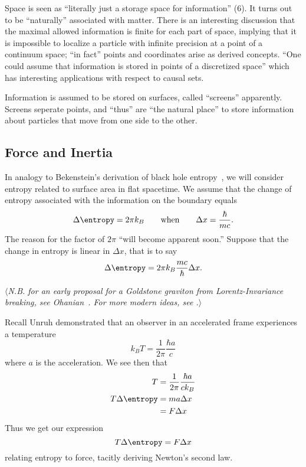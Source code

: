 Space is seen as ``literally just a storage space for
information'' (6). It turns out to be ``naturally'' associated
with matter. There is an interesting discussion that the maximal
allowed information is finite for each part of space, implying
that it is impossible to localize a particle with infinite
precision at a point of a continuum space; ``in fact'' points and
coordinates arise as derived concepts. ``One could assume that
information is stored in points of a discretized space'' which
has interesting applications with respect to causal sets.

Information is assumed to be stored on surfaces, called
``screens'' apparently. Screens seperate points, and ``thus'' are
``the natural place'' to store information about particles that
move from one side to the other.

\subsection{Force and Inertia}

In analogy to Bekenstein's derivation of black hole
entropy~\cite{Bekenstein:1973ur}, we will consider entropy
related to surface area in flat spacetime. We assume that the
change of entropy associated with the information on the boundary
equals
\begin{equation}
\Delta\entropy=2\pi k_{B}\qquad\hbox{when}\qquad\Delta x=\frac{\hbar}{mc}.
\end{equation}
The reason for the factor of $2\pi$ ``will become apparent
soon.'' Suppose that the change in entropy is linear in $\Delta
x$, that is to say
\begin{equation}
\Delta\entropy=2\pi k_{B}\frac{mc}{\hbar}\Delta x.
\end{equation}

\noindent$\langle$\emph{N.B. for an early proposal for a Goldstone graviton from
Lorentz-Invariance breaking, see
Ohanian~\cite{PhysRev.184.1305}. For more modern ideas, see \cite{Jenkins:2003hw}.}$\rangle$

Recall Unruh demonstrated that an observer in an accelerated
frame experiences a temperature
\begin{equation}
k_{B}T=\frac{1}{2\pi}\frac{\hbar a}{c}
\end{equation}
where $a$ is the acceleration. We see then that
\begin{subequations}
\begin{align}
T &= \frac{1}{2\pi}\frac{\hbar a}{ck_{B}}\\
T\Delta\entropy &= ma\Delta x\\
&=F\Delta x
\end{align}
\end{subequations}
Thus we get our expression
\begin{equation}
T\Delta\entropy = F\Delta x
\end{equation}
relating entropy to force, tacitly deriving Newton's second law.
